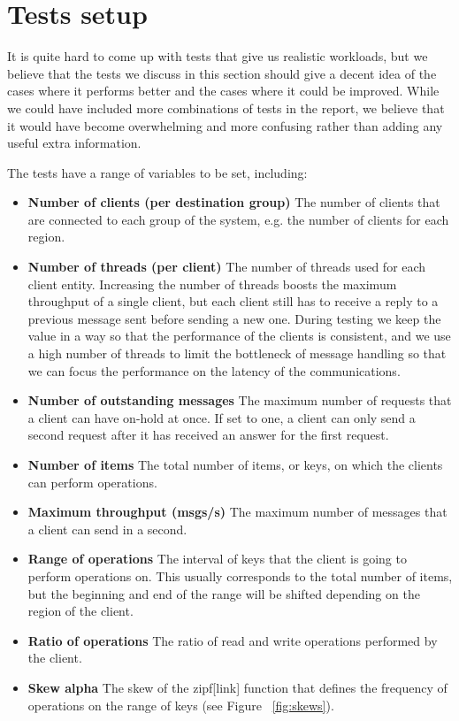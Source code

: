 \section{Tests setup}\label{sec:tests-setup}
It is quite hard to come up with tests that give us realistic workloads, but we believe that the tests we discuss in this section should give a decent idea of the cases where it performs better and the cases where it could be improved. While we could have included more combinations of tests in the report, we believe that it would have become overwhelming and more confusing rather than adding any useful extra information.

The tests have a range of variables to be set, including:
\begin{itemize}
  \item \textbf{Number of clients (per destination group)} The number of clients that are connected to each group of the system, e.g. the number of clients for each region.
  \item \textbf{Number of threads (per client)} The number of threads used for each client entity. Increasing the number of threads boosts the maximum throughput of a single client, but each client still has to receive a reply to a previous message sent before sending a new one. During testing we keep the value in a way so that the performance of the clients is consistent, and we use a high number of threads to limit the bottleneck of message handling so that we can focus the performance on the latency of the communications.
  \item \textbf{Number of outstanding messages} The maximum number of requests that a client can have on-hold at once. If set to one, a client can only send a second request after it has received an answer for the first request.
  \item \textbf{Number of items} The total number of items, or keys, on which the clients can perform operations.
  \item \textbf{Maximum throughput (msgs/s)} The maximum number of messages that a client can send in a second.
  \item \textbf{Range of operations} The interval of keys that the client is going to perform operations on. This usually corresponds to the total number of items, but the beginning and end of the range will be shifted depending on the region of the client.
  \item \textbf{Ratio of operations} The ratio of read and write operations performed by the client.
  \item \textbf{Skew alpha} The skew of the zipf[link] function that defines the frequency of operations on the range of keys (see Figure ~\ref{fig:skews}).
\end{itemize}

